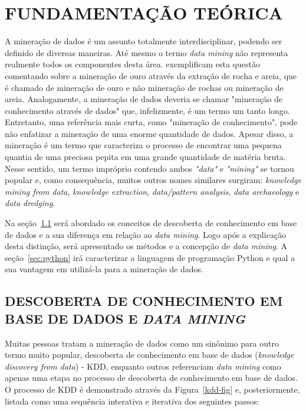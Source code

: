 \chapter{FUNDAMENTAÇÃO TEÓRICA}\label{ch:fundaments-teorico}
A mineração de dados é um assunto totalmente interdisciplinar, podendo ser definido de diversas maneiras. Até mesmo o termo \textit{data mining} não representa realmente todos os componentes desta área.  exemplificam esta questão comentando sobre a mineração de ouro através da extração de rocha e areia, que é chamado de mineração de ouro e não mineração de rochas ou mineração de areia. Analogamente, a mineração de dados deveria se chamar "mineração de conhecimento através de dados" que, infelizmente, é um termo um tanto longo. Entretanto, uma referência mais curta, como "mineração de conhecimento", pode não enfatizar a mineração de uma enorme quantidade de dados. Apesar disso, a mineração é um termo que caracteriza o processo de encontrar uma pequena quantia de uma preciosa pepita em uma grande quantidade de matéria bruta. Nesse sentido, um termo impróprio contendo ambos \textit{"data"} e \textit{"mining"} se tornou popular e, como consequência, muitos outros nomes similares surgiram: \textit{knowledge mining from data}, \textit{knowledge extraction}, \textit{data/pattern analysis}, \textit{data archaeology} e \textit{data dredging}.

Na seção~\ref{sec:kdd} será abordado os conceitos de descoberta de conhecimento em base de dados e a sua diferença em relação ao \textit{data mining}. Logo após a explicação desta distinção, será apresentado os métodos e a concepção de \textit{data mining}. A seção~\ref{sec:python} irá caracterizar a linguagem de programação Python e qual a sua vantagem em utilizá-la para a mineração de dados.

\section{DESCOBERTA DE CONHECIMENTO EM BASE DE DADOS E \textit{DATA MINING}}\label{sec:kdd}
Muitas pessoas tratam a mineração de dados como um sinônimo para outro termo muito popular, descoberta de conhecimento em base de dados (\textit{knowledge discovery from data}) - KDD, enquanto outros referenciam \textit{data mining} como apenas uma etapa no processo de descoberta de conhecimento em base de dados. O processo de KDD é demonstrado através da  Figura~\ref{kdd-fig} e, posteriormente, listada como uma sequência interativa e iterativa dos seguintes passos: \\ \\ \\ \\ \\ \\ \\

